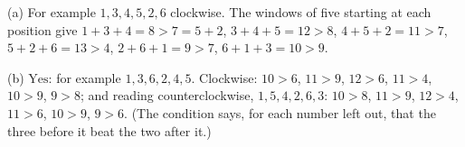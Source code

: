 (a) For example $1,3,4,5,2,6$ clockwise. The windows of five starting at each position give $1+3+4=8>7=5+2$, $3+4+5=12>8$, $4+5+2=11>7$, $5+2+6=13>4$, $2+6+1=9>7$, $6+1+3=10>9$.

(b) $\boxed{\text{Yes}}$: for example $1,3,6,2,4,5$. Clockwise: $10>6$, $11>9$, $12>6$, $11>4$, $10>9$, $9>8$; and reading counterclockwise, $1,5,4,2,6,3$: $10>8$, $11>9$, $12>4$, $11>6$, $10>9$, $9>6$. (The condition says, for each number left out, that the three before it beat the two after it.)
